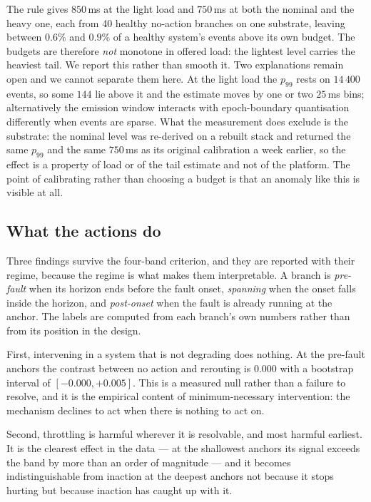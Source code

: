 \documentclass[journal]{IEEEtran}
\begin{document}
The rule gives $850$\,ms at the light load and $750$\,ms at both the nominal and
the heavy one, each from 40 healthy no-action branches on one substrate, leaving
between $0.6\%$ and $0.9\%$ of a healthy system's events above its own budget.
The budgets are therefore \emph{not} monotone in offered load: the lightest level
carries the heaviest tail. We report this rather than smooth it. Two explanations
remain open and we cannot separate them here. At the light load the $p_{99}$ rests
on $14\,400$ events, so some $144$ lie above it and the estimate moves by one or
two $25$\,ms bins; alternatively the emission window interacts with
epoch-boundary quantisation differently when events are sparse. What the
measurement does exclude is the substrate: the nominal level was re-derived on a
rebuilt stack and returned the same $p_{99}$ and the same $750$\,ms as its
original calibration a week earlier, so the effect is a property of load or of
the tail estimate and not of the platform. The point of calibrating rather than
choosing a budget is that an anomaly like this is visible at all.

\subsection{What the actions do}
\label{sec:results-actions}

Three findings survive the four-band criterion, and they are reported with their
regime, because the regime is what makes them interpretable. A branch is
\emph{pre-fault} when its horizon ends before the fault onset, \emph{spanning}
when the onset falls inside the horizon, and \emph{post-onset} when the fault is
already running at the anchor. The labels are computed from each branch's own
numbers rather than from its position in the design.

First, intervening in a system that is not degrading does nothing. At the
pre-fault anchors the contrast between no action and rerouting is $0.000$ with a
bootstrap interval of $[-0.000, +0.005]$. This is a measured null rather than a
failure to resolve, and it is the empirical content of minimum-necessary
intervention: the mechanism declines to act when there is nothing to act on.

Second, throttling is harmful wherever it is resolvable, and most harmful
earliest. It is the clearest effect in the data --- at the shallowest anchors its
signal exceeds the band by more than an order of magnitude --- and it becomes
indistinguishable from inaction at the deepest anchors not because it stops
hurting but because inaction has caught up with it.
\end{document}
